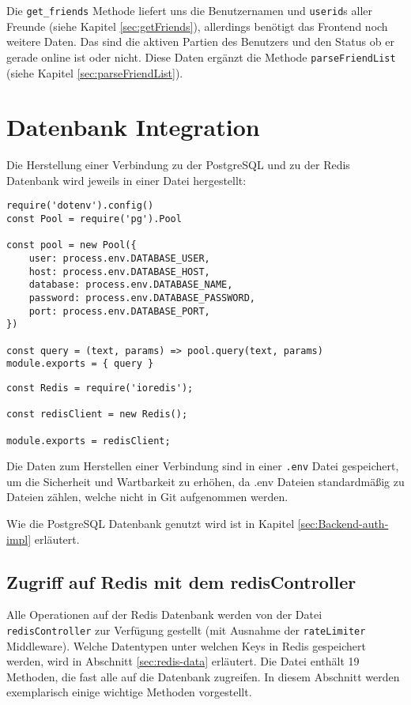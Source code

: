 Die \verb|get_friends| Methode liefert uns die Benutzernamen und \verb|userid|s aller Freunde (siehe Kapitel \ref{sec:getFriends}), allerdings benötigt das Frontend noch weitere Daten. Das sind die aktiven Partien des Benutzers und den Status ob er gerade online ist oder nicht. Diese Daten ergänzt die Methode \verb|parseFriendList| (siehe Kapitel \ref{sec:parseFriendList}).


\section{Datenbank Integration}
\label{sec:Datenbank-Integration}
Die Herstellung einer Verbindung zu der PostgreSQL und zu der Redis Datenbank wird jeweils in einer Datei hergestellt:

\begin{lstlisting}[style=codeStyle, caption={Initialisierung der PostgreSQL Datenbank und einer Methode für die Anfragen}, label={lst:pg-pool}]
require('dotenv').config()
const Pool = require('pg').Pool

const pool = new Pool({
    user: process.env.DATABASE_USER,
    host: process.env.DATABASE_HOST,
    database: process.env.DATABASE_NAME,
    password: process.env.DATABASE_PASSWORD,
    port: process.env.DATABASE_PORT,
})

const query = (text, params) => pool.query(text, params)
module.exports = { query }  
\end{lstlisting}

\begin{lstlisting}[style=codeStyle, caption={Initialisierung einer Redis-Datebank Verbindung}, label={lst:redisClient}]
const Redis = require('ioredis');

const redisClient = new Redis();

module.exports = redisClient;
\end{lstlisting}

Die Daten zum Herstellen einer Verbindung sind in einer \verb|.env| Datei gespeichert, um die Sicherheit und Wartbarkeit zu erhöhen, da .env Dateien standardmäßig zu Dateien zählen, welche nicht in Git aufgenommen werden.

Wie die PostgreSQL Datenbank genutzt wird ist in Kapitel \ref{sec:Backend-auth-impl} erläutert. 

\subsection{Zugriff auf Redis mit dem redisController}
Alle Operationen auf der Redis Datenbank werden von der Datei \verb|redisController| zur Verfügung gestellt (mit Ausnahme der \verb|rateLimiter| Middleware). Welche Datentypen unter welchen Keys in Redis gespeichert werden, wird in Abschnitt \ref{sec:redis-data} erläutert.
Die Datei enthält 19 Methoden, die fast alle auf die Datenbank zugreifen. In diesem Abschnitt werden exemplarisch einige wichtige Methoden vorgestellt.

